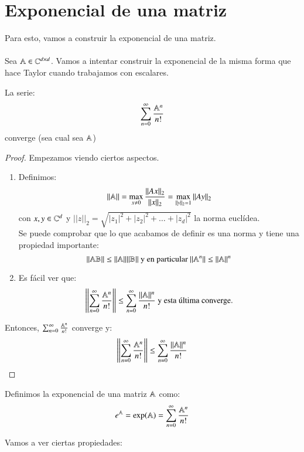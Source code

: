 \section{Exponencial de una matriz}
Para esto, vamos a construir la exponencial de una matriz.\\\\
Sea $\mathbb{A} \in \mathbb{C}^{d\times d}$. Vamos a intentar construir la exponencial de la misma forma que hace Taylor cuando trabajamos con escalares.
\begin{pro}
    La serie:
    $$
        \sum_{n=0}^\infty \frac{\mathbb{A}^n}{n!}
    $$
    converge (sea cual sea $\mathbb{A}$)
\end{pro}
\begin{proof}
    Empezamos viendo ciertos aspectos.\\
    \begin{enumerate}
        \item Definimos:
            $$
            ||\mathbb{A}|| = \max_{x\neq0} \frac{||Ax||_2}{||x||_2} = \max_{||y||_2=1}||Ay||_2
            $$
            con $x, y \in \mathbb{C}^d$ y $||z||_2 = \sqrt{|z_1|^2+|z_2|^2+\ldots+|z_d|^2}$ la norma euclídea.\\
            Se puede comprobar que lo que acabamos de definir es una norma y tiene una propiedad importante:
            $$
                ||\mathbb{A} \mathbb{B}|| \leq ||\mathbb{A}||||\mathbb{B}|| \text{ y en particular } ||\mathbb{A}^n|| \leq ||\mathbb{A}||^n
            $$
        \item Es fácil ver que:
            $$
                \left|\left|\sum_{n=0}^{\infty} \frac{\mathbb{A}^n}{n!}\right|\right| \leq \sum_{n=0}^{\infty} \frac{||\mathbb{A}||^n}{n!} \text{ y esta última converge.}
            $$
    \end{enumerate}
    Entonces, $\sum_{n=0}^{\infty} \frac{\mathbb{A}^n}{n!}$ converge y:
    $$
        \left|\left|\sum_{n=0}^{\infty} \frac{\mathbb{A}^n}{n!}\right|\right| \leq \sum_{n=0}^{\infty} \frac{||\mathbb{A}||^n}{n!}
    $$
\end{proof}
\begin{dfn}
    Definimos la exponencial de una matriz $\mathbb{A}$ como:
    $$
        e^{\mathbb{A}} = \exp(\mathbb{A}) = \sum_{n=0}^{\infty} \frac{\mathbb{A}^n}{n!}
    $$
\end{dfn}
Vamos a ver ciertas propiedades:\\
